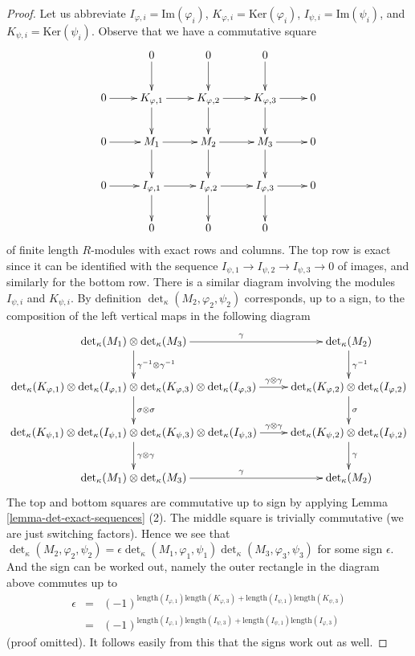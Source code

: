 \begin{proof}
Let us abbreviate
$I_{\varphi, i} = \text{Im}(\varphi_i)$,
$K_{\varphi, i} = \text{Ker}(\varphi_i)$,
$I_{\psi, i} = \text{Im}(\psi_i)$, and
$K_{\psi, i} = \text{Ker}(\psi_i)$.
Observe that we have a commutative square
$$
\xymatrix{
& 0 \ar[d] & 0 \ar[d] & 0 \ar[d] & \\
0 \ar[r] &
K_{\varphi, 1} \ar[r] \ar[d] &
K_{\varphi, 2} \ar[r] \ar[d] &
K_{\varphi, 3} \ar[r] \ar[d] &
0 \\
0 \ar[r] &
M_1 \ar[r] \ar[d] &
M_2 \ar[r] \ar[d] &
M_3 \ar[r] \ar[d] &
0 \\
0 \ar[r] &
I_{\varphi, 1} \ar[r] \ar[d] &
I_{\varphi, 2} \ar[r] \ar[d] &
I_{\varphi, 3} \ar[r] \ar[d] &
0 \\
& 0  & 0  & 0  &
}
$$
of finite length $R$-modules with exact rows and columns.
The top row is exact since it can be identified with the
sequence $I_{\psi, 1} \to I_{\psi, 2} \to I_{\psi, 3} \to 0$
of images, and similarly for the bottom row. There is a similar diagram
involving the modules $I_{\psi, i}$ and $K_{\psi, i}$.
By definition $\det_\kappa(M_2, \varphi_2, \psi_2)$
corresponds, up to a sign, to the composition of the left vertical maps
in the following diagram
$$
\xymatrix{
\det_\kappa(M_1) \otimes
\det_\kappa(M_3) \ar[r]^\gamma
\ar[d]^{\gamma^{-1} \otimes \gamma^{-1}} &
\det_\kappa(M_2)
\ar[d]^{\gamma^{-1}} \\
\det\nolimits_\kappa(K_{\varphi, 1})
\otimes
\det\nolimits_\kappa(I_{\varphi, 1})
\otimes
\det\nolimits_\kappa(K_{\varphi, 3})
\otimes
\det\nolimits_\kappa(I_{\varphi, 3})
\ar[d]^{\sigma \otimes \sigma}
\ar[r]^-{\gamma \otimes \gamma} &
\det\nolimits_\kappa(K_{\varphi, 2})
\otimes
\det\nolimits_\kappa(I_{\varphi, 2})
\ar[d]^\sigma
\\
\det\nolimits_\kappa(K_{\psi, 1})
\otimes
\det\nolimits_\kappa(I_{\psi, 1})
\otimes
\det\nolimits_\kappa(K_{\psi, 3})
\otimes
\det\nolimits_\kappa(I_{\psi, 3})
\ar[d]^{\gamma \otimes \gamma}
\ar[r]^-{\gamma \otimes \gamma}
&
\det\nolimits_\kappa(K_{\psi, 2})
\otimes
\det\nolimits_\kappa(I_{\psi, 2})
\ar[d]^\gamma \\
\det_\kappa(M_1)
\otimes
\det_\kappa(M_3) \ar[r]^\gamma
&
\det_\kappa(M_2)
}
$$
The top and bottom squares are commutative up to sign
by applying Lemma \ref{lemma-det-exact-sequences} (2).
The middle square is trivially
commutative (we are just switching factors). Hence we see
that
$\det\nolimits_\kappa(M_2, \varphi_2, \psi_2) =
\epsilon \det\nolimits_\kappa(M_1, \varphi_1, \psi_1)
\det\nolimits_\kappa(M_3, \varphi_3, \psi_3)
$
for some sign $\epsilon$. And the sign can be worked out, namely
the outer rectangle in the diagram above commutes up to
\begin{eqnarray*}
\epsilon & = &
(-1)^{\text{length}(I_{\varphi, 1})\text{length}(K_{\varphi, 3})
+ \text{length}(I_{\psi, 1})\text{length}(K_{\psi, 3})} \\
& = &
(-1)^{\text{length}(I_{\varphi, 1})\text{length}(I_{\psi, 3})
+ \text{length}(I_{\psi, 1})\text{length}(I_{\varphi, 3})}
\end{eqnarray*}
(proof omitted). It follows easily from this that the signs
work out as well.
\end{proof}

